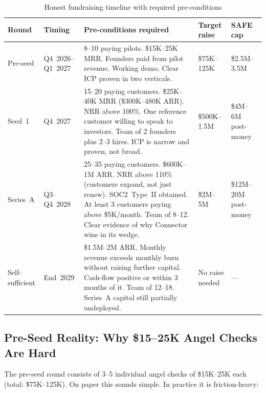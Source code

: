 \begin{table}[H]
\centering
\renewcommand{\arraystretch}{1.6}
\begin{tabularx}{\textwidth}{@{}llXll@{}}
\toprule
\textbf{Round} & \textbf{Timing} & \textbf{Pre-conditions required} &
\textbf{Target raise} & \textbf{SAFE cap} \\
\midrule
Pre-seed & Q4~2026--Q1~2027 &
  8--10 paying pilots. \$15K--25K MRR. Founders paid from pilot
  revenue. Working demo. Clear ICP proven in two verticals. &
  \$75K--125K & \$2.5M--3.5M \\
\midrule
Seed~1 & Q4~2027 &
  15--20 paying customers. \$25K--40K MRR (\$300K--480K ARR). NRR above
  100\%. One reference customer willing to speak to investors. Team of
  2 founders plus 2--3 hires. ICP is narrow and proven, not broad. &
  \$500K--1.5M & \$4M--6M post-money \\
\midrule
Series~A & Q3--Q4~2028 &
  25--35 paying customers. \$600K--1M ARR. NRR above 110\% (customers
  expand, not just renew). SOC2~Type~II obtained. At least 3 customers
  paying above \$5K/month. Team of 8--12. Clear evidence of why Connector
  wins in its wedge. &
  \$2M--5M & \$12M--20M post-money \\
\midrule
Self-sufficient & End~2029 &
  \$1.5M--2M ARR. Monthly revenue exceeds monthly burn without raising
  further capital. Cash-flow positive or within 3 months of it. Team of
  12--18. Series~A capital still partially undeployed. &
  No raise needed & --- \\
\bottomrule
\end{tabularx}
\caption{Honest fundraising timeline with required pre-conditions}
\end{table}

\subsection*{Pre-Seed Reality: Why \$15--25K Angel Checks Are Hard}

The pre-seed round consists of 3--5 individual angel checks of \$15K--25K
each (total: \$75K--125K). On paper this sounds simple. In practice it is
friction-heavy:


